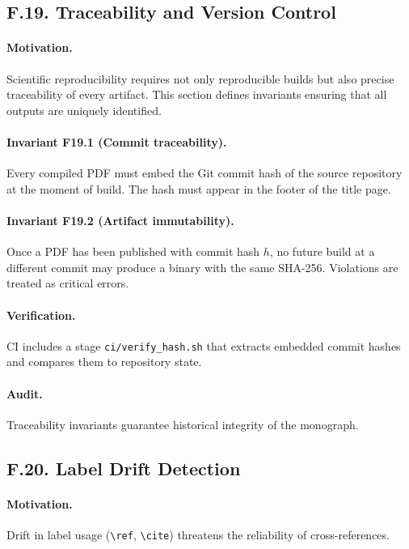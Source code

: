 \subsection*{F.19. Traceability and Version Control}

\paragraph{Motivation.} Scientific reproducibility requires not only reproducible builds but also precise traceability of every artifact. This section defines invariants ensuring that all outputs are uniquely identified.

\paragraph{Invariant F19.1 (Commit traceability).} Every compiled PDF must embed the Git commit hash of the source repository at the moment of build. The hash must appear in the footer of the title page.

\paragraph{Invariant F19.2 (Artifact immutability).} Once a PDF has been published with commit hash $h$, no future build at a different commit may produce a binary with the same SHA-256. Violations are treated as critical errors.

\paragraph{Verification.} CI includes a stage \texttt{ci/verify\_hash.sh} that extracts embedded commit hashes and compares them to repository state.

\paragraph{Audit.} Traceability invariants guarantee historical integrity of the monograph.

\subsection*{F.20. Label Drift Detection}

\paragraph{Motivation.} Drift in label usage (\texttt{\textbackslash ref}, \texttt{\textbackslash cite}) threatens the reliability of cross-references.

